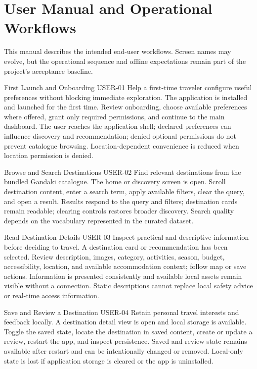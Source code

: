 \chapter{User Manual and Operational Workflows}
\label{app:user_manual}

This manual describes the intended end-user workflows. Screen names may evolve,
but the operational sequence and offline expectations remain part of the
project's acceptance baseline.

\EvidenceSheet
{First Launch and Onboarding}
{USER-01}
{Help a first-time traveler configure useful preferences without blocking immediate exploration.}
{The application is installed and launched for the first time.}
{Review onboarding, choose available preferences where offered, grant only required permissions, and continue to the main dashboard.}
{The user reaches the application shell; declared preferences can influence discovery and recommendation; denied optional permissions do not prevent catalogue browsing.}
{Location-dependent convenience is reduced when location permission is denied.}

\EvidenceSheet
{Browse and Search Destinations}
{USER-02}
{Find relevant destinations from the bundled Gandaki catalogue.}
{The home or discovery screen is open.}
{Scroll destination content, enter a search term, apply available filters, clear the query, and open a result.}
{Results respond to the query and filters; destination cards remain readable; clearing controls restores broader discovery.}
{Search quality depends on the vocabulary represented in the curated dataset.}

\EvidenceSheet
{Read Destination Details}
{USER-03}
{Inspect practical and descriptive information before deciding to travel.}
{A destination card or recommendation has been selected.}
{Review description, images, category, activities, season, budget, accessibility, location, and available accommodation context; follow map or save actions.}
{Information is presented consistently and available local assets remain visible without a connection.}
{Static descriptions cannot replace local safety advice or real-time access information.}

\EvidenceSheet
{Save and Review a Destination}
{USER-04}
{Retain personal travel interests and feedback locally.}
{A destination detail view is open and local storage is available.}
{Toggle the saved state, locate the destination in saved content, create or update a review, restart the app, and inspect persistence.}
{Saved and review state remains available after restart and can be intentionally changed or removed.}
{Local-only state is lost if application storage is cleared or the app is uninstalled.}

